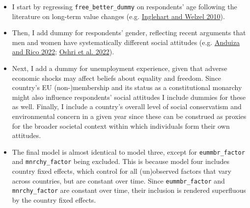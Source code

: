 \documentclass[
]{article}
\begin{document}
\begin{itemize}
\item
  I start by regressing \texttt{free\_better\_dummy} on respondents' age
  following the literature on long-term value changes (e.g.
  \protect\hyperlink{ref-inglehart2010changing}{Inglehart and Welzel
  2010}).
\item
  Then, I add dummy for respondents' gender, reflecting recent arguments
  that men and women have systematically different social attitudes
  (e.g. \protect\hyperlink{ref-anduiza2022sexism}{Anduiza and Rico
  2022}; \protect\hyperlink{ref-oshri2022risk}{Oshri et al. 2022}).
\item
  Next, I add a dummy for unemployment experience, given that adverse
  economic shocks may affect beliefs about equality and freedom. Since
  country's EU (non-)membership and its status as a constitutional
  monarchy might also influence respondents' social attitudes I include
  dummies for these as well. Finally, I include a country's overall
  level of social conservatism and environmental concern in a given year
  since these can be construed as proxies for the broader societal
  context within which individuals form their own attitudes.
\item
  The final model is almost identical to model three, except for
  \texttt{eummbr\_factor} and \texttt{mnrchy\_factor} being excluded.
  This is because model four includes country fixed effects, which
  control for all (un)observed factors that vary across countries, but
  are constant over time. Since \texttt{eummbr\_factor} and
  \texttt{mnrchy\_factor} are constant over time, their inclusion is
  rendered superfluous by the country fixed effects.
\end{itemize}
\end{document}
